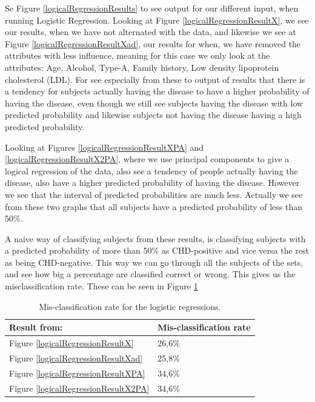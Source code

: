 Se Figure \ref{logicalRegressionResults} to see output for our different input, when running Logistic Regression. Looking at Figure \ref{logicalRegressionResultX}, we see our results, when we have not alternated with the data, and likewise we see at Figure \ref{logicalRegressionResultXad}, our results for when, we have removed the attributes with less influence, meaning for this case we only look at the attributes: Age, Alcohol, Type-A, Family history, Low density lipoprotein cholesterol (LDL). For see especially from these to output of results that there is a tendency for subjects actually having the disease to have a higher probability of having the disease, even though we still see subjects having the disease with low predicted probability and likewise subjects not having the disease having a high predicted probability.

Looking at Figures \ref{logicalRegressionResultXPA} and \ref{logicalRegressionResultX2PA}, where we use principal components to give a logical regression of the data, also see a tendency of people actually having the disease, also have a higher predicted probability of having the disease. However we see that the interval of predicted probabilities are much less. Actually we see from these two graphs that all subjects have a predicted probability of less than 50\%.

A naive way of classifying subjects from these results, is classifying subjects with a predicted probability of more than 50\% as CHD-positive and vice versa the rest as being CHD-negative. This way we can go through all the subjects of the sets, and see how big a percentage are classified correct or wrong. This gives us the misclassification rate. These can be seen in Figure \ref{logicalRegressionErrorRate}

\begin{table}
\begin{tabular}{|l|l|} \hline
Result from: & Mis-classification rate \\ \hline
Figure \ref{logicalRegressionResultX} & 26,6\% \\ \hline 
Figure \ref{logicalRegressionResultXad} & 25,8\% \\ \hline
Figure \ref{logicalRegressionResultXPA} & 34,6\% \\ \hline
Figure \ref{logicalRegressionResultX2PA} & 34,6\% \\ \hline
\end{tabular}
\caption{Mis-classification rate for the logistic regressions.}
\label{logicalRegressionErrorRate}
\end{table}

